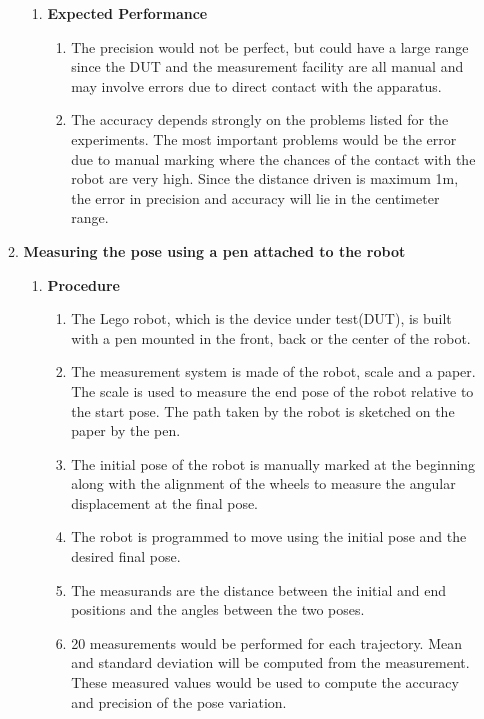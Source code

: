 \documentclass[10pt,a4paper]{article}
\begin{document}
\begin{enumerate}[label=\Roman*]
\begin{enumerate}[label=\roman*)]
\begin{enumerate}
\item
\textbf{Expected Performance}\\
\begin{enumerate}
	\item
	The precision would not be perfect, but could have a large range since the DUT and the measurement facility are all manual and may involve errors due to direct contact with the apparatus.
	\item
	The accuracy depends strongly on the problems listed for the experiments. The most important problems would be the error due to manual marking where the chances of the contact with the robot are very high. Since the distance driven is maximum 1m, the error in precision and accuracy will lie in the centimeter range.
\end{enumerate}
\end{enumerate}
\vspace{0.5cm}

\item 
\Large{\textbf{ Measuring the pose using a pen attached to the robot}}\\

\begin{enumerate}

\item
\Large{\textbf{Procedure}}\\

\begin{enumerate}
	\item
	The Lego robot, which is the device under test(DUT), is built with a pen mounted in the front, back or the center of the robot.
	\item
	The measurement system is made of the robot, scale and a paper. The scale is used to measure the end pose of the robot relative to the start pose. The path taken by the robot is sketched on the paper by the pen.
	\item
	The initial pose of the robot is manually marked at the beginning along with the alignment of the wheels to measure the angular displacement at the final pose.
	\item
	The robot is programmed to move using the initial pose and the desired final pose.
	\item
	The measurands are the distance between the initial and end positions and the angles between the two poses.
	\item
	20 measurements would be performed for each trajectory. Mean and standard deviation will be computed from the measurement. These measured values would be used to compute the accuracy and precision of the pose variation. 
\end{enumerate}
\vspace{0.5cm}


\end{enumerate}
\end{enumerate}
\end{enumerate}
\end{document}
